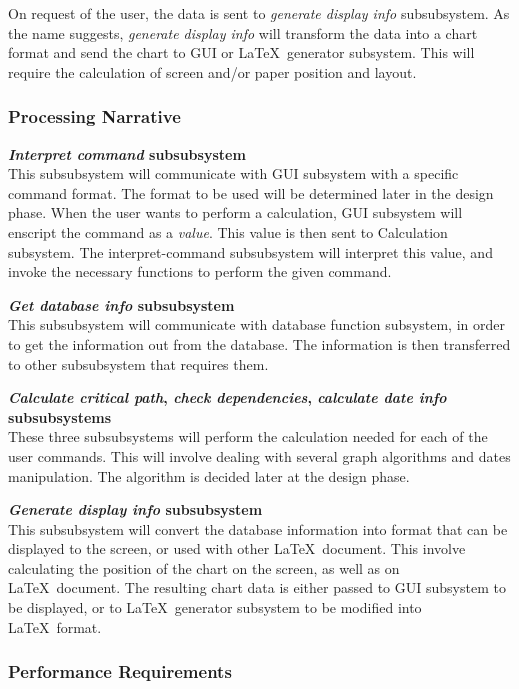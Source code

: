 On request of the user, the data is sent to {\em generate display info}\/
subsubsystem.  As the name suggests, {\em generate display info}\/ will
transform the data into a chart format and send the chart to GUI or
\LaTeX\ generator subsystem.  This will require the calculation of
screen and/or paper position and layout.

\subsubsection{Processing Narrative}

{\bf {\em Interpret command}\/ subsubsystem}\\
This subsubsystem will communicate with GUI subsystem with a specific
command format. The format to be used will be determined later in the
design phase.  When the user wants to perform a calculation, GUI
subsystem will enscript the command as a {\em value}. This value is
then sent to Calculation subsystem.  The interpret-command
subsubsystem will interpret this value, and invoke the necessary
functions to perform the given command.

{\bf {\em Get database info}\/ subsubsystem}\\
This subsubsystem will communicate with database function subsystem,
in order to get the information out from the database. The information
is then transferred to other subsubsystem that requires them.

{\bf {\em Calculate critical path}, {\em check dependencies}, {\em
calculate date info}\/ subsubsystems}\\
These three subsubsystems will perform the calculation needed for each
of the user commands. This will involve dealing with several graph
algorithms and dates manipulation. The algorithm is decided later at
the design phase.

{\bf {\em Generate display info}\/ subsubsystem}\\
This subsubsystem will convert the database information into format
that can be displayed to the screen, or used with other \LaTeX\
document. This involve calculating the position of the chart on the
screen, as well as on \LaTeX\ document. The resulting chart data is
either passed to GUI subsystem to be displayed, or to \LaTeX\
generator subsystem to be modified into \LaTeX\ format.

\subsubsection{Performance Requirements}

